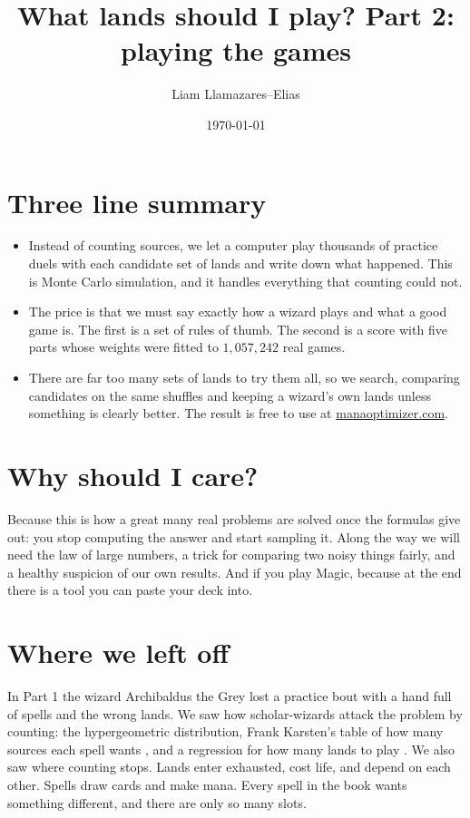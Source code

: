 \documentclass[
    a4paper,
    DIV=13,
    abstract=true,
    numbers=noenddot
]{scrartcl}
\begin{document}
\title{What lands should I play? Part 2: playing the games}
\author{Liam Llamazares--Elias}
\date{\today}
\maketitle

\section{Three line summary}
\begin{itemize}
  \item Instead of counting sources, we let a computer play thousands of practice duels with each candidate set of lands and write down what happened. This is Monte Carlo simulation, and it handles everything that counting could not.
  \item The price is that we must say exactly how a wizard plays and what a good game is. The first is a set of rules of thumb. The second is a score with five parts whose weights were fitted to $1{,}057{,}242$ real games.
  \item There are far too many sets of lands to try them all, so we search, comparing candidates on the same shuffles and keeping a wizard's own lands unless something is clearly better. The result is free to use at \href{https://manaoptimizer.com}{manaoptimizer.com}.
\end{itemize}

\section{Why should I care?}
Because this is how a great many real problems are solved once the formulas give out: you stop computing the answer and start sampling it. Along the way we will need the law of large numbers, a trick for comparing two noisy things fairly, and a healthy suspicion of our own results. And if you play Magic, because at the end there is a tool you can paste your deck into.

\section{Where we left off}
In Part 1 the wizard Archibaldus the Grey lost a practice bout with a hand full of spells and the wrong lands. We saw how scholar-wizards attack the problem by counting: the hypergeometric distribution, Frank Karsten's table of how many sources each spell wants \cite{karsten2018sources}, and a regression for how many lands to play \cite{karsten2022lands}. We also saw where counting stops. Lands enter exhausted, cost life, and depend on each other. Spells draw cards and make mana. Every spell in the book wants something different, and there are only so many slots.
\end{document}

